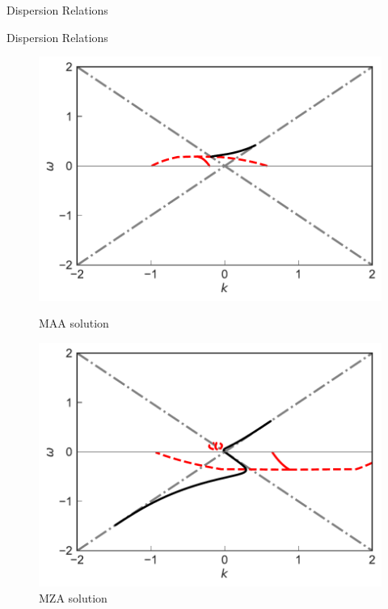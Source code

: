 \documentclass[9pt]{beamer}
\begin{document}
\begin{darkframes}
\begin{frame}{Dispersion Relations}
\end{frame}





\begin{frame}{Dispersion Relations}

   \begin{figure}
      \includegraphics[width=\linewidth]{assets/dr/spectBoxC1MAADRPltBlob.pdf}
      \caption*{MAA solution}
      \endminipage\hfill
      \includegraphics[width=\linewidth]{assets/dr/spectBoxC1MZADRPltBlob.pdf}
      \caption*{MZA solution}
      \endminipage\hfill
   \end{figure}




\end{frame}
\end{darkframes}
\end{document}
